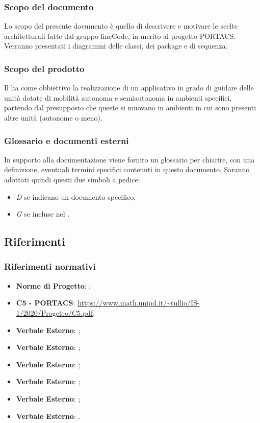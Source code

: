 \subsubsection{Scopo del documento}
Lo scopo del presente documento è quello di descrivere e motivare le scelte architetturali fatte dal gruppo lineCode, in merito al progetto PORTACS. Verranno presentati i diagrammi delle classi, dei package e di sequenza.

\subsubsection{Scopo del prodotto}
Il  ha come obbiettivo la realizzazione di un applicativo  in grado di guidare delle unità dotate di mobilità autonoma e semiautonoma in ambienti specifici, partendo dal presupposto che queste si muovano in ambienti in cui sono presenti altre unità (autonome o meno).

\subsubsection{Glossario e documenti esterni}
In supporto alla documentazione viene fornito un glossario per chiarire, con una definizione, eventuali termini specifici contenuti in questo documento. Saranno adottati quindi questi due simboli a pedice:
\begin{itemize}
	\item \textit{D} se indicano un documento specifico;
	\item \textit{G} se incluse nel .
\end{itemize}

\subsection{Riferimenti}
\subsubsection{Riferimenti normativi}
\begin{itemize}
	\item \textbf{Norme di Progetto}: ;
	\item \textbf{{ C5 - PORTACS}}: \url{https://www.math.unipd.it/~tullio/IS-1/2020/Progetto/C5.pdf};
	\item \textbf{Verbale Esterno}: ;
	\item \textbf{Verbale Esterno}: ;
	\item \textbf{Verbale Esterno}: ;
	\item \textbf{Verbale Esterno}: ;
	\item \textbf{Verbale Esterno}: ;
	\item \textbf{Verbale Esterno}: .
\end{itemize}
